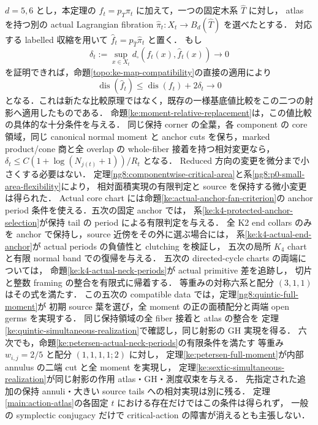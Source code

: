 \begin{remark}\label{ke:atlas-ke-value-criterion}
$d=5,6$ とし，本定理の $f_t=p_T\pi_t$ に加えて，一つの固定木系 $\widehat T$ に対し，
atlas を持つ別の actual Lagrangian fibration
$\widehat\pi_t:X_t\to B_d(\widehat T)$ を選べたとする．
対応する labelled 収縮を用いて $\widehat f_t=p_{\widehat T}\widehat\pi_t$ と置く．
もし
\[
 \delta_t:=\sup_{x\in X_t}d_\square(f_t(x),\widehat f_t(x))\longrightarrow0
\]
を証明できれば，命題\ref{topo:ke-map-compatibility}の直接の適用により
\[
 \operatorname{dis}(\widehat f_t)
 \le\operatorname{dis}(f_t)+2\delta_t\longrightarrow0
\]
となる．これは新たな比較原理ではなく，既存の一様基底値比較をこの二つの射影へ適用したものである．
命題\ref{ke:moment-relative-replacement}は，この値比較の具体的な十分条件を与える．
同じ保持 corner の全葉，各 component の core 領域，同じ canonical normal
moment と anchor cuts を保ち，marked product/cone 商と全 overlap の
whole-fiber 接着を持つ相対変更なら，
$\delta_t\le C(1+\log(N_{j(t)}+1))/R_t$ となる．
Reduced 方向の変更を微分まで小さくする必要はない．
定理\ref{ng8:componentwise-critical-area}と系\ref{ng8:p0-small-area-flexibility}により，
相対面積実現の有限判定と source を保持する微小変更は得られた．
Actual core chart には命題\ref{ke:actual-anchor-fan-criterion}の
anchor period 条件を使える．五次の固定 anchor では，
系\ref{ke:k4-protected-anchor-selection}が保持 tail の period による有限判定を与える．
全 K2 end collars のみを anchor で保持し，source 近傍をその外に選ぶ場合には，
系\ref{ke:k4-actual-end-anchor}が actual periods の負値性と clutching を検証し，
五次の局所 $K_4$ chart と有限 normal band での復帰を与える．
五次の directed-cycle charts の両端については，
命題\ref{ke:k4-actual-neck-periods}が actual primitive 差を追跡し，
切片と整数 framing の整合を有限式に帰着する．
等重みの対称六系と配分 $(3,1,1)$ はその式を満たす．
この五次の compatible data では，定理\ref{ng8:quintic-full-moment}が
初期 source 葉を選び，全 moment の正の面積配分と両端 open germs を実現する．
同じ保持領域の全 fiber 接着と atlas の整合を
定理\ref{ke:quintic-simultaneous-realization}で確認し，同じ射影の GH 実現を得る．
六次でも，命題\ref{ke:petersen-actual-neck-periods}の有限条件を満たす
等重み $w_{i,j}=2/5$ と配分 $(1,1,1,1;2)$ に対し，
定理\ref{ke:petersen-full-moment}が内部 annulus の二端 cut と全 moment を実現し，
定理\ref{ke:sextic-simultaneous-realization}が同じ射影の作用 atlas・GH・測度収束を与える．
先指定された追加の保持 annuli・大きい source tails への相対実現は別に残る．
定理\ref{main:action-atlas}の各固定 $t$ における存在だけではこの条件は得られず，
一般の symplectic conjugacy だけで critical-action の障害が消えるとも主張しない．
\end{remark}

